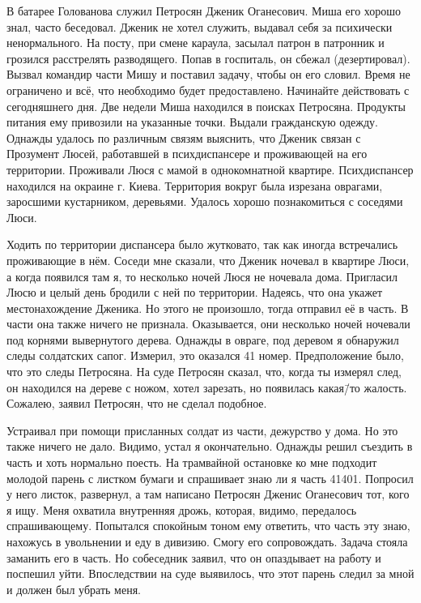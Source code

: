 В батарее Голованова служил Петросян Дженик Оганесович. Миша его хорошо знал, часто беседовал. Дженик не хотел служить, выдавал себя за психически ненормального. На посту, при смене караула, засылал патрон в патронник и грозился расстрелять разводящего. Попав в госпиталь, он сбежал (дезертировал). Вызвал командир части Мишу и поставил задачу, чтобы он его словил. Время не ограничено и всё, что необходимо будет предоставлено. Начинайте действовать с сегодняшнего дня. Две недели Миша находился в поисках Петросяна. Продукты питания ему привозили на указанные точки. Выдали гражданскую одежду. Однажды удалось по различным связям выяснить, что Дженик связан с Прозумент Люсей, работавшей в психдиспансере и проживающей на его территории. Проживали Люся с мамой в однокомнатной квартире. Психдиспансер находился на окраине г. Киева. Территория вокруг была изрезана оврагами, заросшими кустарником, деревьями. Удалось хорошо познакомиться с соседями Люси. 

Ходить по территории диспансера было жутковато, так как иногда встречались проживающие в нём. Соседи мне сказали, что Дженик ночевал в квартире Люси, а когда появился там я, то несколько ночей Люся не ночевала дома. Пригласил Люсю и целый день бродили с ней по территории. Надеясь, что она укажет местонахождение Дженика. Но этого не произошло, тогда отправил её в часть. В части она также ничего не признала. Оказывается, они несколько ночей ночевали под корнями вывернутого дерева. Однажды в овраге, под деревом я обнаружил следы солдатских сапог. Измерил, это оказался 41 номер. Предположение было, что это следы Петросяна. На суде Петросян сказал, что, когда ты измерял след, он находился на дереве с ножом, хотел зарезать, но появилась какая\=/то жалость. Сожалею, заявил Петросян, что не сделал подобное. 

Устраивал при помощи присланных солдат из части, дежурство у дома. Но это также ничего не дало. Видимо, устал я окончательно. Однажды решил съездить в часть и хоть нормально поесть. На трамвайной остановке ко мне подходит молодой парень с листком бумаги и спрашивает знаю ли я часть 41401. Попросил у него листок, развернул, а там написано Петросян Дженис Оганесович тот, кого я ищу. Меня охватила внутренняя дрожь, которая, видимо, передалось спрашивающему. Попытался спокойным тоном ему ответить, что часть эту знаю, нахожусь в увольнении и еду в дивизию. Смогу его сопровождать. Задача стояла заманить его в часть. Но собеседник заявил, что он опаздывает на работу и поспешил уйти. Впоследствии на суде выявилось, что этот парень следил за мной и должен был убрать меня. 


